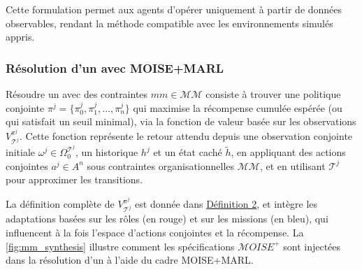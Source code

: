\noindent Cette formulation permet aux agents  d'opérer uniquement à partir de données observables, rendant la méthode compatible avec les environnements simulés appris.

\subsubsection*{Résolution d'un  avec MOISE+MARL}

Résoudre un  avec des contraintes $mm \in \mathcal{MM}$ consiste à trouver une politique conjointe $\pi^j = \{\pi^j_0, \pi^j_1, \dots, \pi^j_n\}$ qui maximise la récompense cumulée espérée (ou qui satisfait un seuil minimal), via la fonction de valeur basée sur les observations $V_{\mathcal{T}^j}^{\pi^j}$. Cette fonction représente le retour attendu depuis une observation conjointe initiale $\omega^j \in \Omega^{\mathcal{T}^j}_0$, un historique $h^j$ et un état caché $\tilde{h}$, en appliquant des actions conjointes $a^j \in A^n$ sous contraintes organisationnelles $\mathcal{MM}$, et en utilisant $\mathcal{T}^j$ pour approximer les transitions.

La définition complète de $V_{\mathcal{T}^j}^{\pi^j}$ est donnée dans \hyperref[eq:single_value_function_parallel]{Définition 2}, et intègre les adaptations basées sur les rôles (en rouge) et sur les missions (en bleu), qui influencent à la fois l'espace d'actions conjointes et la récompense. La \autoref{fig:mm_synthesis} illustre comment les spécifications $\mathcal{M}OISE^+$ sont injectées dans la résolution d'un  à l'aide du cadre MOISE+MARL.

\medskip

